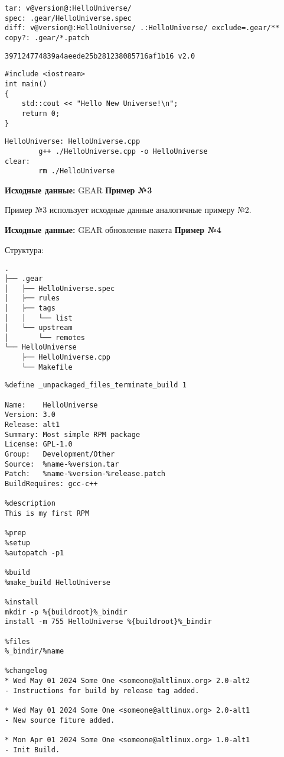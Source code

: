 \begin{verbatim}
tar: v@version@:HelloUniverse/
spec: .gear/HelloUniverse.spec
diff: v@version@:HelloUniverse/ .:HelloUniverse/ exclude=.gear/**
copy?: .gear/*.patch

\end{verbatim}

\begin{verbatim}
397124774839a4aeede25b281238085716af1b16 v2.0

\end{verbatim}

\begin{verbatim}
#include <iostream>
int main()
{
    std::cout << "Hello New Universe!\n";
    return 0;
}

\end{verbatim}

\begin{verbatim}
HelloUniverse: HelloUniverse.cpp
        g++ ./HelloUniverse.cpp -o HelloUniverse
clear:
        rm ./HelloUniverse

\end{verbatim}

\textbf{Исходные данные:} GEAR \textbf{Пример №3}

Пример №3  использует исходные данные аналогичные примеру №2.

\textbf{Исходные данные:} GEAR обновление пакета \textbf{Пример №4}

Структура:
\begin{verbatim}
.
├── .gear
│   ├── HelloUniverse.spec
│   ├── rules
│   ├── tags
│   │   └── list
│   └── upstream
│       └── remotes
└── HelloUniverse
    ├── HelloUniverse.cpp
    └── Makefile

\end{verbatim}

\begin{verbatim}
%define _unpackaged_files_terminate_build 1

Name:    HelloUniverse
Version: 3.0
Release: alt1
Summary: Most simple RPM package
License: GPL-1.0
Group:   Development/Other
Source:  %name-%version.tar
Patch:   %name-%version-%release.patch
BuildRequires: gcc-c++

%description
This is my first RPM

%prep
%setup
%autopatch -p1

%build
%make_build HelloUniverse

%install
mkdir -p %{buildroot}%_bindir
install -m 755 HelloUniverse %{buildroot}%_bindir

%files
%_bindir/%name

%changelog
* Wed May 01 2024 Some One <someone@altlinux.org> 2.0-alt2
- Instructions for build by release tag added.

* Wed May 01 2024 Some One <someone@altlinux.org> 2.0-alt1
- New source fiture added.

* Mon Apr 01 2024 Some One <someone@altlinux.org> 1.0-alt1
- Init Build.

\end{verbatim}


